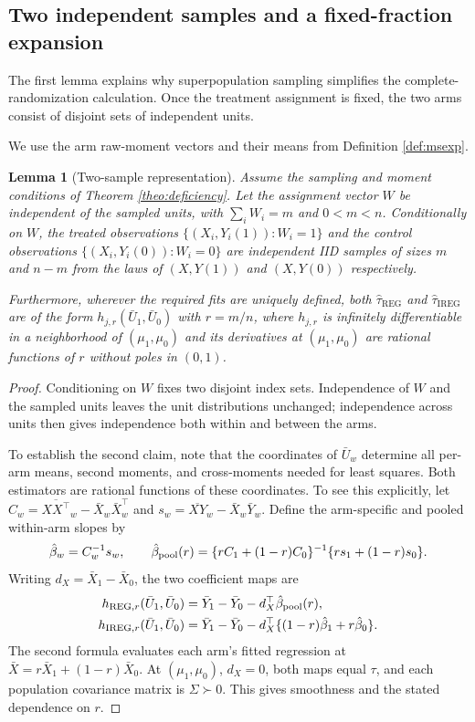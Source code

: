 \documentclass{article}
\newcommand{\htau}{\hat{\tau}}
\newcommand{\IREG}{\mathrm{IREG}}
\newcommand{\REG}{\mathrm{REG}}
\theoremstyle{plain}
\newtheorem{lemm}[prop]{Lemma}
\theoremstyle{definition}
\theoremstyle{remark}
\begin{document}
\subsection{Two independent samples and a fixed-fraction expansion}

The first lemma explains why superpopulation sampling simplifies the
complete-randomization calculation. Once the treatment assignment is
fixed, the two arms consist of disjoint sets of independent units.

We use the arm raw-moment vectors and their means from
Definition \ref{def:msexp}.

\begin{lemm}[Two-sample representation]
\label{lemm:two_sample}
Assume the sampling and moment conditions of Theorem
\ref{theo:deficiency}. Let the assignment vector $W$ be
independent of the sampled units, with $\sum_iW_i=m$ and $0<m<n$. Conditionally on $W$, the treated observations $\{(X_i,Y_i(1)):W_i=1\}$ and the control observations $\{(X_i,Y_i(0)):W_i=0\}$ are independent IID samples of sizes $m$ and $n-m$ from the laws of $(X,Y(1))$ and $(X,Y(0))$ respectively. 

Furthermore, wherever the required fits are uniquely defined, both $\htau_\REG$ and $\htau_\IREG$ are of the form $h_{j,r}(\bar U_1,\bar U_0)$ with $r=m/n$, where $h_{j,r}$ is infinitely differentiable in a neighborhood of $(\mu_1,\mu_0)$ and its derivatives at $(\mu_1,\mu_0)$ are rational functions of $r$ without poles in $(0,1)$.
\end{lemm}

\begin{proof}
Conditioning on $W$ fixes two disjoint index sets. Independence of
$W$ and the sampled units leaves the unit distributions unchanged;
independence across units then gives independence both within and
between the arms.

To establish the second claim, note that the coordinates of $\bar U_w$
determine all per-arm means, second moments, and cross-moments needed
for least squares. Both estimators are rational functions of these
coordinates. To see this explicitly, let
$C_w=\overline{XX^\top}_w-\bar X_w\bar X_w^\top$ and
$s_w=\overline{XY}_w-\bar X_w\bar Y_w$. Define the arm-specific
and pooled within-arm slopes by
\[
\hat\beta_w=C_w^{-1}s_w,
\qquad
\hat\beta_{\rm pool}(r)
=\{rC_1+(1-r)C_0\}^{-1}\{rs_1+(1-r)s_0\}.
\]
Writing $d_X=\bar X_1-\bar X_0$, the two coefficient maps are
\[
\begin{aligned}
h_{\REG,r}(\bar U_1,\bar U_0)
&=\bar Y_1-\bar Y_0-d_X^\top\hat\beta_{\rm pool}(r),\\
h_{\IREG,r}(\bar U_1,\bar U_0)
&=\bar Y_1-\bar Y_0
-d_X^\top\{(1-r)\hat\beta_1+r\hat\beta_0\}.
\end{aligned}
\]
The second formula evaluates each arm's fitted regression at
$\bar X=r\bar X_1+(1-r)\bar X_0$. At $(\mu_1,\mu_0)$,
$d_X=0$, both maps equal $\tau$, and each population covariance
matrix is $\Sigma\succ0$. This gives smoothness and the stated
dependence on $r$.
\end{proof}
\end{document}
